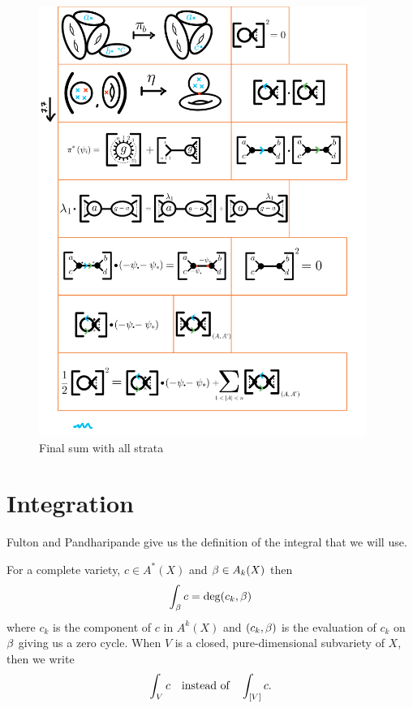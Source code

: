 \documentclass[12pt]{memoir}
\begin{document}
\begin{Ex}
     \begin{figure}[h!]
        \centering
        \includegraphics[width=0.95\textwidth, trim= 1.3cm 2.3cm 4.3cm 23.8cm,clip]{../figs/FigsDNnotability2.pdf}
        \caption{Final sum with all strata}
        \label{fig:irr-squared-5}
    \end{figure}
\end{Ex}

\section{Integration}

Fulton and Pandharipande \cite{FPNotes} give us the definition of the integral that we will use. 

\begin{Def}
    For a complete variety, $c\in A^\ast(X)$ and $\beta\in A_k(X)$ then 
    $$\int_\beta c=\deg(c_k,\beta)$$
    where $c_k$ is the component of $c$ in $A^k(X)$ and $(c_k,\beta)$ is the evaluation of $c_k$ on $\beta$ giving us a zero cycle. When $V$ is a closed, pure-dimensional subvariety of $X$, then we write 
    $$\int_V c\quad\text{instead of}\quad\int_{\left\lbrack V\right\rbrack}c.$$
\end{Def}
\end{document}
